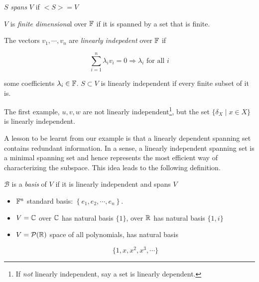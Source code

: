 \documentclass[a4paper]{article}
\begin{document}
\begin{defi}
	$ S $ \emph{spans} $ V $ if $ <S> = V $
\end{defi}

\begin{defi}
	$ V $ is \emph{finite dimensiona}l over $ \mathbb{F} $ if it is spanned by a set that is finite.
\end{defi}

\begin{defi}
	The vectors $ v_{1},\cdots,v_{n} $ are \emph{linearly indepedent} over $ \mathbb{F} $ if 
	
	\[ \sum_{i = 1}^{n} \lambda_{i} v_{i} = 0 \Rightarrow \lambda_{i} \text{ for all } i \]
	
	some coefficients $ \lambda_{i} \in \mathbb{F}  $. $ S \subset V $ is linearly independent if every finite subset of it is. 
\end{defi}

\begin{eg}
	The first example, $ u,v,w $ are not linearly independent\footnote{If \emph{not} linearly independent, say a set is linearly dependent.}, but the set $ \{  \delta_{X} \; | \; x \in X \} $ is linearly independent.
	
\end{eg}


A lesson to be learnt from our example is that a linearly dependent spanning set contains redundant information. In a sense, a linearly independent spanning set is a minimal spanning set and hence represents the most efficient way of characterizing the subspace. This idea leads to the following definition.

\begin{defi}
	$ \mathcal{B} $ is a \emph{basis} of $ V $ if it is linearly independent and spans $ V $
\end{defi}


\begin{eg}
	\begin{itemize}
	
	
	
	\item $ \mathbb{F}^{n}  $  standard basis: $ \left\{     e_{1},e_{2},\cdots,e_{n} \right\} $.

	\item $ V = \mathbb{C} $ over $ \mathbb{C} $ has natural basis $ \{ 1\} $, over $ \mathbb{R} $ has natural basis $ \{ 1,i \} $

	\item $ V = \mathcal{P}(\mathbb{R}) $ space of all polynomials, has natural basis 
	
	\[ \{ 1,x,x^{2},x^{3},\cdots \} \]
	
	
		
\end{itemize}
\end{eg}
\end{document}
